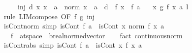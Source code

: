 \begin{isabellebody}
\ \ \ \ \ inj{\isacharcolon}{\kern0pt}\ {\isachardoublequoteopen}{\isasymexists}d{\isachargreater}{\kern0pt}{}{\isachardot}{\kern0pt}\ {\isasymforall}x{\isachardot}{\kern0pt}\ x\ {\isasymnoteq}\ a\ {\isasymand}\ norm\ {\isacharparenleft}{\kern0pt}x\ {\isacharminus}{\kern0pt}\ a{\isacharparenright}{\kern0pt}\ {\isacharless}{\kern0pt}\ d\ {\isasymlongrightarrow}\ f\ x\ {\isasymnoteq}\ f\ a{\isachardoublequoteclose}\isanewline
\ \ \ {\isachardoublequoteopen}{\isacharparenleft}{\kern0pt}{\isasymlambda}x{\isachardot}{\kern0pt}\ g\ {\isacharparenleft}{\kern0pt}f\ x{\isacharparenright}{\kern0pt}{\isacharparenright}{\kern0pt}\ {\isasymmidarrow}a{\isasymrightarrow}\ l{\isachardoublequoteclose}\isanewline
%
\isadelimproof
\ \ %
\endisadelimproof
%
\isatagproof
{}\isamarkupfalse%
\ {\isacharparenleft}{\kern0pt}rule\ LIM{\isacharunderscore}{\kern0pt}compose{}\ {\isacharbrackleft}{\kern0pt}OF\ f\ g\ inj{\isacharbrackright}{\kern0pt}{\isacharparenright}{\kern0pt}%
\endisatagproof
{\isafoldproof}%
%
\isadelimproof
\isanewline
%
\endisadelimproof
\isanewline
{}\isamarkupfalse%
\ isCont{\isacharunderscore}{\kern0pt}norm\ {\isacharbrackleft}{\kern0pt}simp{\isacharbrackright}{\kern0pt}{\isacharcolon}{\kern0pt}\ {\isachardoublequoteopen}isCont\ f\ a\ {\isasymLongrightarrow}\ isCont\ {\isacharparenleft}{\kern0pt}{\isasymlambda}x{\isachardot}{\kern0pt}\ norm\ {\isacharparenleft}{\kern0pt}f\ x{\isacharparenright}{\kern0pt}{\isacharparenright}{\kern0pt}\ a{\isachardoublequoteclose}\isanewline
\ \ \ f\ {\isacharcolon}{\kern0pt}{\isacharcolon}{\kern0pt}\ {\isachardoublequoteopen}{\isacharprime}{\kern0pt}a{\isacharcolon}{\kern0pt}{\isacharcolon}{\kern0pt}t{}{\isacharunderscore}{\kern0pt}space\ {\isasymRightarrow}\ {\isacharprime}{\kern0pt}b{\isacharcolon}{\kern0pt}{\isacharcolon}{\kern0pt}real{\isacharunderscore}{\kern0pt}normed{\isacharunderscore}{\kern0pt}vector{\isachardoublequoteclose}\isanewline
%
\isadelimproof
\ \ %
\endisadelimproof
%
\isatagproof
{}\isamarkupfalse%
\ {\isacharparenleft}{\kern0pt}fact\ continuous{\isacharunderscore}{\kern0pt}norm{\isacharparenright}{\kern0pt}%
\endisatagproof
{\isafoldproof}%
%
\isadelimproof
\isanewline
%
\endisadelimproof
\isanewline
{}\isamarkupfalse%
\ isCont{\isacharunderscore}{\kern0pt}rabs\ {\isacharbrackleft}{\kern0pt}simp{\isacharbrackright}{\kern0pt}{\isacharcolon}{\kern0pt}\ {\isachardoublequoteopen}isCont\ f\ a\ {\isasymLongrightarrow}\ isCont\ {\isacharparenleft}{\kern0pt}{\isasymlambda}x{\isachardot}{\kern0pt}\ {\isasymbar}f\ x{\isasymbar}{\isacharparenright}{\kern0pt}\ a{\isachardoublequoteclose}\isanewline

\end{isabellebody}
